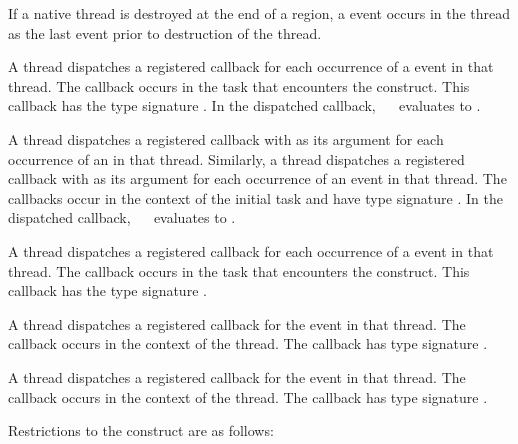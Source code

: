 If a native thread is destroyed at the end of a  region, a
 event occurs in the thread as the last event prior 
to destruction of the thread.

\tools

A thread dispatches a registered 
callback for each occurrence of a  event in that
thread.  The callback occurs in the task that encounters the 
 construct.  This callback has the type signature
. In the dispatched callback, 
\code{(}~\code{&}~ evaluates to .

A thread dispatches a registered 
callback with  as its  argument
for each occurrence of an  in that thread.
Similarly, a thread dispatches a registered 
callback with  as its  argument
for each occurrence of an  event in that thread.
The callbacks occur in the context of the initial task and have type 
signature . In the dispatched
callback, \code{(}~\code{&}~ evaluates to
.

A thread dispatches a registered 
callback for each occurrence of a  event in that
thread.  The callback occurs in the task that encounters
the  construct.  This callback has the type signature
.

A thread dispatches a registered 
callback for the  event in that thread.
The callback occurs in the context of the thread.  The callback 
has type signature .

A thread dispatches a registered 
callback for the  event in that thread. The callback 
occurs in the context of the thread.  The callback has type signature
.

\restrictions
Restrictions to the  construct are as follows:


